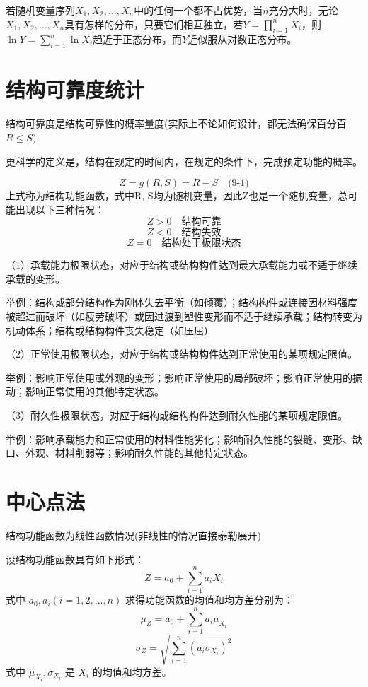 \documentclass[12pt, a4paper, oneside, UTF8]{ctexbook}
\begin{document}
\begin{theorem}
    若随机变量序列\(X_1, X_2, \ldots, X_n\)中的任何一个都不占优势，当\(n\)充分大时，无论\(X_1, X_2, \ldots, X_n\)具有怎样的分布，只要它们相互独立，若\(Y = \prod_{i=1}^{n} X_i\)，则\(\ln Y = \sum_{i=1}^{n} \ln X_i\)趋近于正态分布，而\(Y\)近似服从对数正态分布。
\end{theorem}

\section{结构可靠度统计}

\begin{definition}
    结构可靠度是结构可靠性的概率量度(实际上不论如何设计，都无法确保百分百$R\le S$)

    更科学的定义是，结构在规定的时间内，在规定的条件下，完成预定功能的概率。
\end{definition}

\begin{definition}
    \[ Z = g(R, S) = R - S \quad \text{(9-1)} \]
上式称为结构功能函数，式中R, S均为随机变量，因此Z也是一个随机变量，总可能出现以下三种情况：
\[ Z > 0 \quad \text{结构可靠} \]
\[ Z < 0 \quad \text{结构失效} \]
\[ Z = 0 \quad \text{结构处于极限状态} \]
\end{definition}

（1）承载能力极限状态，对应于结构或结构构件达到最大承载能力或不适于继续承载的变形。

举例：结构或部分结构作为刚体失去平衡（如倾覆）；结构构件或连接因材料强度被超过而破坏（如疲劳破坏）或因过渡到塑性变形而不适于继续承载；结构转变为机动体系；结构或结构构件丧失稳定（如压屈）

（2）正常使用极限状态，对应于结构或结构构件达到正常使用的某项规定限值。

举例：影响正常使用或外观的变形；影响正常使用的局部破坏；影响正常使用的振动；影响正常使用的其他特定状态。

（3）耐久性极限状态，对应于结构或结构构件达到耐久性能的某项规定限值。

举例：影响承载能力和正常使用的材料性能劣化；影响耐久性能的裂缝、变形、缺口、外观、材料削弱等；影响耐久性能的其他特定状态。

\section{中心点法}

\begin{definition}
    结构功能函数为线性函数情况(非线性的情况直接泰勒展开)

    设结构功能函数具有如下形式：
\[ Z = a_0 + \sum_{i=1}^{n} a_i X_i  \]
式中 \( a_0, a_i (i = 1, 2, \ldots, n) \) 
求得功能函数的均值和均方差分别为：
\[ \mu_Z = a_0 + \sum_{i=1}^{n} a_i \mu_{X_i}  \]
\[ \sigma_Z = \sqrt{\sum_{i=1}^{n} (a_i \sigma_{X_i})^2}  \]
式中 \(\mu_{X_i}, \sigma_{X_i}\) 是 \(X_i\) 的均值和均方差。
\end{definition}
\end{document}
